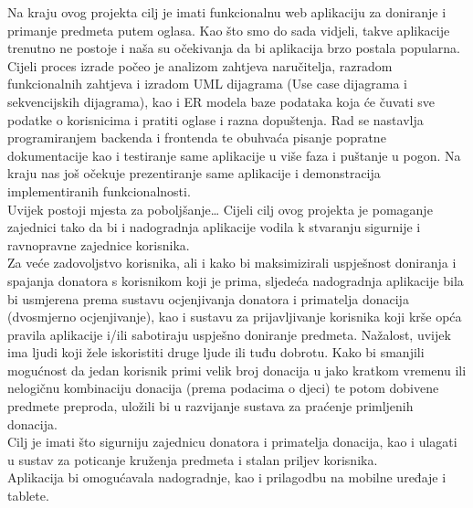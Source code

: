 		\newline
		Na kraju ovog projekta cilj je imati funkcionalnu web aplikaciju za doniranje i primanje predmeta putem oglasa. Kao što smo do sada vidjeli, takve aplikacije trenutno ne postoje i naša su očekivanja da bi aplikacija brzo postala popularna. \\
		\newline
		Cijeli proces izrade počeo je analizom zahtjeva naručitelja, razradom funkcionalnih zahtjeva i izradom UML dijagrama (Use case dijagrama i sekvencijskih dijagrama), kao i ER modela baze podataka koja će čuvati sve podatke o korisnicima i pratiti oglase i razna dopuštenja. Rad se nastavlja programiranjem backenda i frontenda te obuhvaća pisanje popratne dokumentacije kao i testiranje same aplikacije u više faza i puštanje u pogon. Na kraju nas još očekuje prezentiranje same aplikacije i demonstracija implementiranih funkcionalnosti.\\
		\newline
		\eject
		Uvijek postoji mjesta za poboljšanje… Cijeli cilj ovog projekta je pomaganje zajednici tako da bi i nadogradnja aplikacije vodila k stvaranju sigurnije i ravnopravne zajednice korisnika. \\
		\newline
		Za veće zadovoljstvo korisnika, ali i kako bi maksimizirali uspješnost doniranja i spajanja donatora s korisnikom koji je prima, sljedeća nadogradnja aplikacije bila bi usmjerena prema sustavu ocjenjivanja donatora i primatelja donacija (dvosmjerno ocjenjivanje), kao i sustavu za prijavljivanje korisnika koji krše opća pravila aplikacije i/ili sabotiraju uspješno doniranje predmeta. Nažalost, uvijek ima ljudi koji žele iskoristiti druge ljude ili tuđu dobrotu. Kako bi smanjili mogućnost da jedan korisnik primi velik broj donacija u jako kratkom vremenu ili nelogičnu kombinaciju donacija (prema podacima o djeci) te potom dobivene predmete preproda, uložili bi u razvijanje sustava za praćenje primljenih donacija.\\
		\newline
		Cilj je imati što sigurniju zajednicu donatora i primatelja donacija, kao i ulagati u sustav za poticanje kruženja predmeta i stalan priljev korisnika. \\
		\newline
		Aplikacija bi omogućavala nadogradnje, kao i prilagodbu na mobilne uređaje i tablete.
		\eject
		